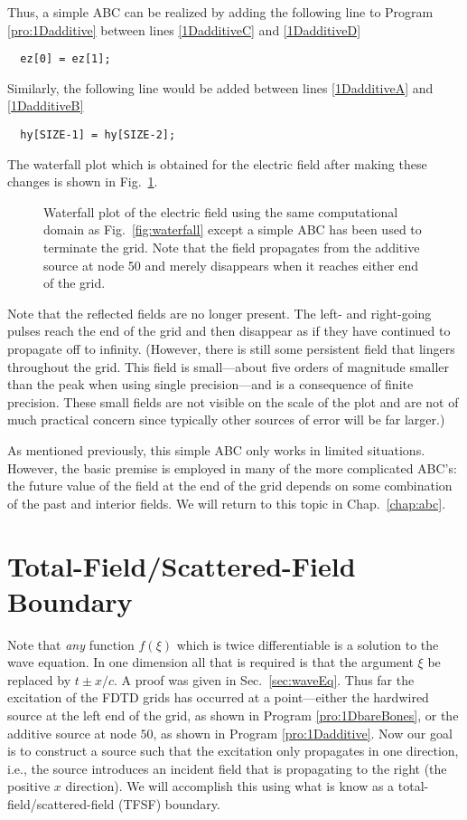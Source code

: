 Thus, a simple ABC can be realized by adding the following line to
Program \ref{pro:1Dadditive} between lines \ref{1DadditiveC} and
\ref{1DadditiveD}
\begin{verbatim}
  ez[0] = ez[1];
\end{verbatim}
Similarly, the following line would be added between lines
\ref{1DadditiveA} and \ref{1DadditiveB}
\begin{verbatim}
  hy[SIZE-1] = hy[SIZE-2];
\end{verbatim}
The waterfall plot which is obtained for the electric field after
making these changes is shown in Fig.\ \ref{fig:waterfallABC}.
\begin{figure}
  \begin{center}
  \end{center}
  \caption{Waterfall plot of the electric field using the same
    computational domain as Fig.\ \ref{fig:waterfall} except a simple
    ABC has been used to terminate the grid.  Note that the field
    propagates from the additive source at node 50 and merely
    disappears when it reaches either end of the grid.}
  \label{fig:waterfallABC}
\end{figure}
Note that the reflected fields are no longer present.  The left- and
right-going pulses reach the end of the grid and then disappear as if
they have continued to propagate off to infinity.  (However, there is
still some persistent field that lingers throughout the grid.  This
field is small---about five orders of magnitude smaller than the peak
when using single precision---and is a consequence of finite
precision.  These small fields are not visible on the scale of the
plot and are not of much practical concern since typically other
sources of error will be far larger.)

As mentioned previously, this simple ABC only works in limited
situations.  However, the basic premise is employed in many of the
more complicated ABC's: the future value of the field at the end of the
grid depends on some combination of the past and interior fields.  We
will return to this topic in Chap.\ \ref{chap:abc}.

\section{Total-Field/Scattered-Field Boundary \label{sec:tfsf}}

Note that {\em any} function $f(\xi)$ which is twice differentiable is
a solution to the wave equation.  In one dimension all that is
required is that the argument $\xi$ be replaced by $t\pm x/c$.  A
proof was given in Sec.\ \ref{sec:waveEq}.  Thus far the excitation of
the FDTD grids has occurred at a point---either the hardwired source
at the left end of the grid, as shown in Program
\ref{pro:1DbareBones}, or the additive source at node $50$, as shown
in Program \ref{pro:1Dadditive}.  Now our goal is to construct a
source such that the excitation only propagates in one direction,
i.e., the source introduces an incident field that is propagating to
the right (the positive $x$ direction).  We will accomplish this using
what is know as a total-field/scattered-field (TFSF) boundary.

